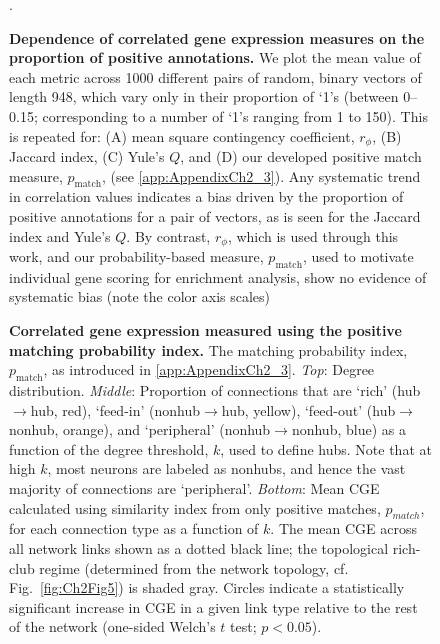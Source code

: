 \begin{figure}[h!]
 \caption{{\bf Dependence of correlated gene expression measures on the proportion of positive annotations.} We plot the mean value of each metric across 1000 different pairs of random, binary vectors of length 948, which vary only in their proportion of `1's (between 0--0.15; corresponding to a number of `1's ranging from 1 to 150).
This is repeated for:
(A) mean square contingency coefficient, $r_\phi$,
(B) Jaccard index,
(C) Yule's $Q$, and
(D) our developed positive match measure, $p_\mathrm{match}$, (see \ref{app:AppendixCh2_3}).
Any systematic trend in correlation values indicates a bias driven by the proportion of positive annotations for a pair of vectors, as is seen for the Jaccard index and Yule's $Q$.
By contrast, $r_\phi$, which is used through this work, and our probability-based measure, $p_\mathrm{match}$, used to motivate individual gene scoring for enrichment analysis, show no evidence of systematic bias (note the color axis scales)}.
\label{fig:Ch2S2_Fig}
\end{figure}


\begin{figure}[h!]
 \caption{{\bf Correlated gene expression measured using the positive matching probability index.} The matching probability index, $p_\mathrm{match}$, as introduced in \ref{app:AppendixCh2_3}.
\emph{Top}: Degree distribution.
\emph{Middle}: Proportion of connections that are `rich' (hub$\rightarrow$hub, red), `feed-in' (nonhub$\rightarrow$hub, yellow), `feed-out' (hub$\rightarrow$nonhub, orange), and `peripheral' (nonhub$\rightarrow$nonhub, blue) as a function of the degree threshold, $k$, used to define hubs.
Note that at high $k$, most neurons are labeled as nonhubs, and hence the vast majority of connections are `peripheral'.
\emph{Bottom}: Mean CGE calculated using similarity index from only positive matches, $p_{match}$, for each connection type as a function of $k$.
The mean CGE across all network links shown as a dotted black line; the topological rich-club regime (determined from the network topology, cf. Fig.~\ref{fig:Ch2Fig5}) is shaded gray.
Circles indicate a statistically significant increase in CGE in a given link type relative to the rest of the network (one-sided Welch's $t$ test; $p < 0.05$).}
\label{fig:Ch2S3_Fig}
\end{figure}



